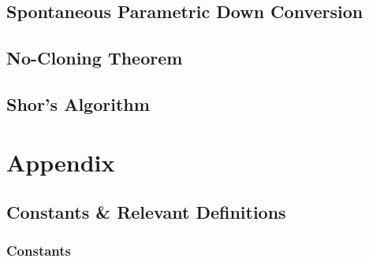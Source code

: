 \documentclass[colorlinks,11pt,a4paper,normalphoto,withhyper,ragged2e]{altareport}
\begin{document}
	
	\subsection{Spontaneous Parametric Down Conversion}
	
	\subsection{No-Cloning Theorem}
	
	\subsection{Shor's Algorithm}
	
	
	
		
\section{Appendix}
	
	\subsection{Constants \& Relevant Definitions}
		
		\subsubsection{Constants}
		
\end{document}
